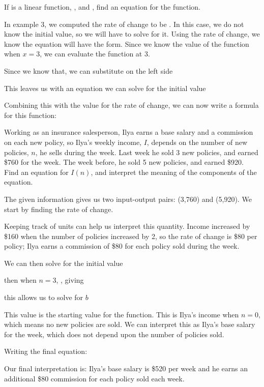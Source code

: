 \begin{example}
If is a linear function, , and , find an equation for the function.

In example 3, we computed the rate of change to be . In this case, we do
not know the initial value, so we will have to solve for it. Using the
rate of change, we know the equation will have the form. Since we know
the value of the function when $x = 3$, we can evaluate the
function at 3.

Since we know that, we can substitute on the left side

This leaves us with an equation we can solve for the initial value

Combining this with the value for the rate of change, we can now write a
formula for this function:

\end{example}
\begin{example}

Working as an insurance salesperson, Ilya earns a base salary and a
commission on each new policy, so Ilya's weekly income, $I$,
depends on the number of new policies, $n$, he sells during the
week. Last week he sold 3 new policies, and earned \$760 for the week.
The week before, he sold 5 new policies, and earned \$920. Find an
equation for $I(n)$, and interpret the meaning of the components of
the equation.

The given information gives us two input-output pairs: (3,760) and
(5,920). We start by finding the rate of change.

Keeping track of units can help us interpret this quantity. Income
increased by \$160 when the number of policies increased by 2, so the
rate of change is \$80 per policy; Ilya earns a commission of \$80 for
each policy sold during the week.

We can then solve for the initial value

then when $n = 3$, , giving

this allows us to solve for $b$

This value is the starting value for the function. This is Ilya's income
when $n = 0$, which means no new policies are sold. We can
interpret this as Ilya's base salary for the week, which does not depend
upon the number of policies sold.

Writing the final equation:

Our final interpretation is: Ilya's base salary is \$520 per week and he
earns an additional \$80 commission for each policy sold each week.
\end{example}

